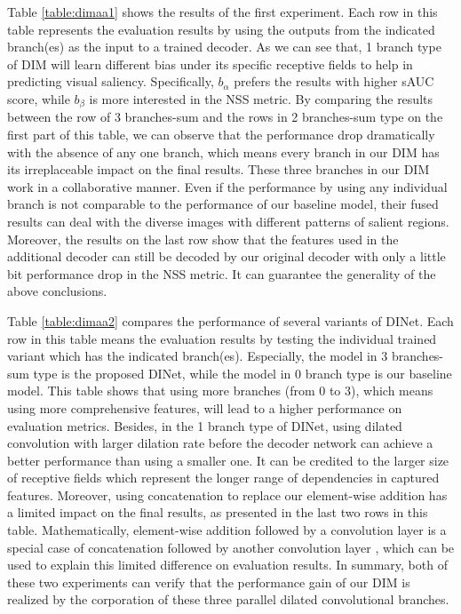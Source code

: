Table \ref{table:dimaa1} shows the results of the first experiment. Each row in this table represents the evaluation results by using the outputs from the indicated branch(es) as the input to a trained decoder. As we can see that, 1 branch type of DIM will learn different bias under its specific receptive fields to help in predicting visual saliency. Specifically, $b_\alpha$ prefers the results with higher sAUC score, while $b_\beta$ is more interested in the NSS metric. By comparing the results between the row of 3 branches-sum and the rows in 2 branches-sum type on the first part of this table, we can observe that the performance drop dramatically with the absence of any one branch, which means every branch in our DIM has its irreplaceable impact on the final results. These three branches in our DIM work in a collaborative manner. Even if the performance by using any individual branch is not comparable to the performance of our baseline model, their fused results can deal with the diverse images with different patterns of salient regions. Moreover, the results on the last row show that the features used in the additional decoder can still be decoded by our original decoder with only a little bit performance drop in the NSS metric. It can guarantee the generality of the above conclusions.


Table \ref{table:dimaa2} compares the performance of several variants of DINet.
 Each row in this table means the evaluation results by testing the individual trained variant which has the indicated branch(es). Especially, the model in 3 branches-sum type is the proposed DINet, while the model in 0 branch type is our baseline model. This table shows that using more branches (from 0 to 3), which means using more comprehensive features, will lead to a higher performance on evaluation metrics. Besides, in the 1 branch type of DINet, using dilated convolution with larger dilation rate before the decoder network can achieve a better performance than using a smaller one. It can be credited to the larger size of receptive fields which represent the longer range of dependencies in captured features. Moreover, using concatenation to replace our element-wise addition has a limited impact on the final results, as presented in the last two rows in this table. Mathematically, element-wise addition followed by a convolution layer is a special case of concatenation followed by another convolution layer \cite{chen2017dual}, which can be used to explain this limited difference on evaluation results. In summary, both of these two experiments can verify that the performance gain of our DIM is realized by the corporation of these three parallel dilated convolutional branches.







